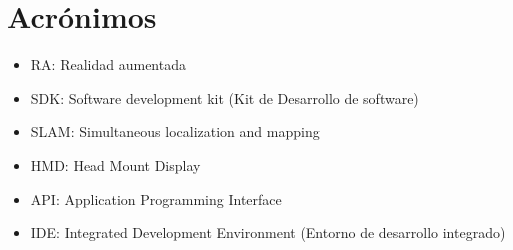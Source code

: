 \newpage
\chapter*{Acrónimos}

\begin{itemize}
\item RA: Realidad aumentada
\item SDK: Software development kit (Kit de Desarrollo de software) 
\item SLAM: Simultaneous localization and mapping 
\item HMD: Head Mount Display 
\item API: Application Programming Interface 
\item IDE: Integrated Development Environment (Entorno de desarrollo integrado)
\end{itemize}

\noindent
